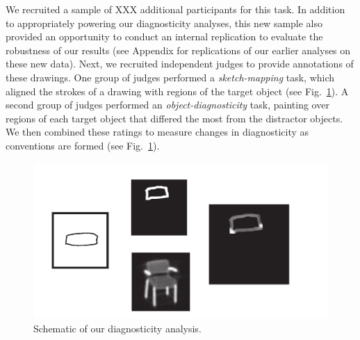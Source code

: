 \documentclass[11pt,letterpaper]{article}
\begin{document}
We recruited a sample of XXX additional participants for this task.
In addition to appropriately powering our diagnosticity analyses, this new sample also provided an opportunity to conduct an internal replication to evaluate the robustness of our results  (see Appendix for replications of our earlier analyses on these new data).
Next, we recruited independent judges to provide annotations of these drawings. 
One group of judges performed a \emph{sketch-mapping} task, which aligned the strokes of a drawing with regions of the target object (see Fig.~\ref{fig:diagnosticity_schema}).
A second group of judges performed an \emph{object-diagnosticity} task, painting over regions of each target object that differed the most from the distractor objects.
We then combined these ratings to measure changes in diagnosticity as conventions are formed (see Fig.~\ref{fig:diagnosticity_schema}).


\begin{figure}[b!]
\includegraphics[width=\linewidth]{figures/diagnosticity.pdf}
\centering
\caption{Schematic of our diagnosticity analysis.}
\label{fig:diagnosticity_schema}
\end{figure}

\end{document}

